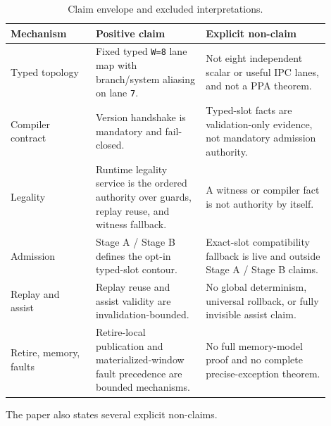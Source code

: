 \documentclass[twocolumn]{article}
\begin{document}
\begin{table}[t]
\centering
\small
\setlength{\tabcolsep}{3pt}
\renewcommand{\arraystretch}{0.96}
\caption{Claim envelope and excluded interpretations.}
\begin{tabular}{@{}>{\raggedright\arraybackslash}p{0.24\linewidth}>{\raggedright\arraybackslash}p{0.31\linewidth}>{\raggedright\arraybackslash}p{0.35\linewidth}@{}}
\toprule
Mechanism & Positive claim & Explicit non-claim \\
\midrule
Typed topology & Fixed typed \texttt{W=8} lane map with branch/system aliasing on lane \texttt{7}. & Not eight independent scalar or useful IPC lanes, and not a PPA theorem. \\
Compiler contract & Version handshake is mandatory and fail-closed. & Typed-slot facts are validation-only evidence, not mandatory admission authority. \\
Legality & Runtime legality service is the ordered authority over guards, replay reuse, and witness fallback. & A witness or compiler fact is not authority by itself. \\
Admission & Stage A / Stage B defines the opt-in typed-slot contour. & Exact-slot compatibility fallback is live and outside Stage A / Stage B claims. \\
Replay and assist & Replay reuse and assist validity are invalidation-bounded. & No global determinism, universal rollback, or fully invisible assist claim. \\
Retire, memory, faults & Retire-local publication and materialized-window fault precedence are bounded mechanisms. & No full memory-model proof and no complete precise-exception theorem. \\
\bottomrule
\end{tabular}
\end{table}

The paper also states several explicit non-claims.
\end{document}
